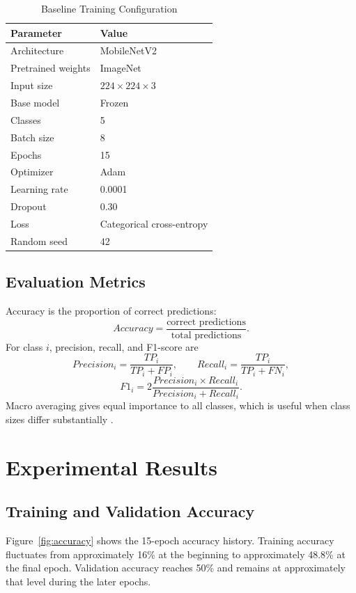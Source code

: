 \documentclass[conference]{IEEEtran}
\begin{document}
\begin{table}[!t]
\centering
\caption{Baseline Training Configuration}
\label{tab:training}
\begin{tabular}{ll}
\toprule
\textbf{Parameter} & \textbf{Value}\\
\midrule
Architecture & MobileNetV2\\
Pretrained weights & ImageNet\\
Input size & $224\times224\times3$\\
Base model & Frozen\\
Classes & 5\\
Batch size & 8\\
Epochs & 15\\
Optimizer & Adam\\
Learning rate & 0.0001\\
Dropout & 0.30\\
Loss & Categorical cross-entropy\\
Random seed & 42\\
\bottomrule
\end{tabular}
\end{table}

\subsection{Evaluation Metrics}
Accuracy is the proportion of correct predictions:
\begin{equation}
Accuracy=\frac{\text{correct predictions}}{\text{total predictions}}.
\end{equation}
For class $i$, precision, recall, and F1-score are
\begin{equation}
Precision_i=\frac{TP_i}{TP_i+FP_i},\qquad
Recall_i=\frac{TP_i}{TP_i+FN_i},
\end{equation}
\begin{equation}
F1_i=2\frac{Precision_i\times Recall_i}{Precision_i+Recall_i}.
\end{equation}
Macro averaging gives equal importance to all classes, which is useful when class sizes differ substantially \cite{sokolova2009}.

\section{Experimental Results}
\subsection{Training and Validation Accuracy}
Figure~\ref{fig:accuracy} shows the 15-epoch accuracy history. Training accuracy fluctuates from approximately 16\% at the beginning to approximately 48.8\% at the final epoch. Validation accuracy reaches 50\% and remains at approximately that level during the later epochs.
\end{document}

